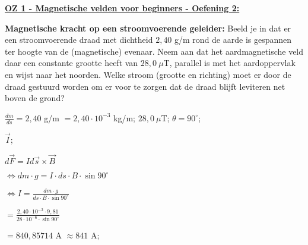 \textbf{\underline{OZ 1 - Magnetische velden voor beginners - Oefening 2:}}
\vspace{0.5cm}

\textbf{Magnetische kracht op een stroomvoerende geleider:} Beeld je in dat er een stroomvoerende draad met dichtheid $ 2,40 $ g/m rond de aarde is gespannen ter hoogte van de (magnetische) evenaar. Neem aan dat het aardmagnetische veld daar een constante grootte heeft van $ 28,0 \ \mu$T, parallel is  met het aardoppervlak en wijst naar het noorden. Welke stroom (grootte en richting) moet er door de draad gestuurd worden om er voor te zorgen dat de draad blijft leviteren net boven de grond?

\begin{description}[labelwidth=1.5cm, leftmargin=!]
    \item[Geg. :]   $ \frac{dm}{ds} = 2,40 $ g/m $ = 2,40 \cdot 10^{-3} $ kg/m; $ 28,0 \ \mu$T; $ \theta = 90^{\circ} $;
    \item[Gevr. :]  $ \vec{I} $;
    \item[Opl. :]   $ d\vec{F} = I d\vec{s} \times \vec{B} $
    
                    \hspace{-0.58cm} $ \Leftrightarrow
                    dm \cdot g = I \cdot ds \cdot B \cdot \sin{90^{\circ}} $
    
                    \hspace{-0.58cm} $ \Leftrightarrow
                    I = \frac{dm \cdot g}{ds \cdot B \cdot \sin{90^{\circ}}} $
    
                    \hspace{0.13cm} $
                    = \frac{2,40 \cdot 10^{-3} \cdot 9,81}{28 \cdot 10^{-6} \cdot \sin{90^{\circ}}} $
    
                    \hspace{0.13cm} $
                    = 840,85714 $ A $ \approx 841 $ A;
\end{description}

\vspace{1cm}